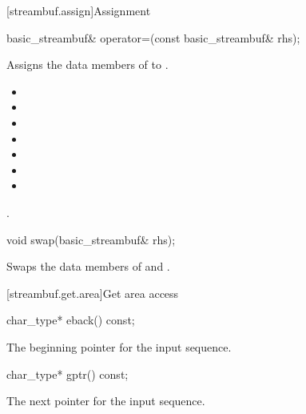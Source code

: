 [streambuf.assign]{Assignment}

%
\begin{itemdecl}
basic_streambuf& operator=(const basic_streambuf& rhs);
\end{itemdecl}

\begin{itemdescr}
\pnum
\effects Assigns the data members of 
to .

\pnum
\postconditions

\begin{itemize}
\item {}
\item {}
\item {}
\item {}
\item {}
\item {}
\item {}
\end{itemize}

\pnum
\returns {}.
\end{itemdescr}

%
\begin{itemdecl}
void swap(basic_streambuf& rhs);
\end{itemdecl}

\begin{itemdescr}
\pnum
\effects Swaps the data members of 
and .
\end{itemdescr}

[streambuf.get.area]{Get area access}

%
\begin{itemdecl}
char_type* eback() const;
\end{itemdecl}

\begin{itemdescr}
\pnum
\returns
The beginning pointer for the input sequence.
\end{itemdescr}

%
\begin{itemdecl}
char_type* gptr() const;
\end{itemdecl}

\begin{itemdescr}
\pnum
\returns
The next pointer for the input sequence.
\end{itemdescr}

